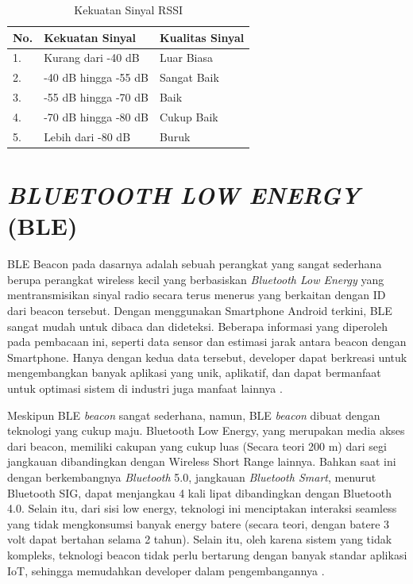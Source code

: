 \begin{table}[H]
	\centering
	\caption{Kekuatan Sinyal RSSI \citep{VerisIndustries2013}}
	\label{t_rssi}
	\begin{tabular}{|l|l|l|}
		\hline
		\textbf{No.} & \textbf{Kekuatan Sinyal} & \textbf{Kualitas Sinyal} \\
		\hline
		1.           & Kurang dari -40 dB       & Luar Biasa               \\
		\hline
		2.           & -40 dB hingga -55 dB     & Sangat Baik              \\
		\hline
		3.           & -55 dB hingga -70 dB     & Baik                     \\
		\hline
		4.           & -70 dB hingga -80 dB     & Cukup Baik               \\
		\hline
		5.           & Lebih dari -80 dB        & Buruk                    \\
		\hline
	\end{tabular}
\end{table}

\section{\uppercase{\textit{BLUETOOTH LOW ENERGY} (BLE)}}
\par BLE Beacon pada dasarnya adalah sebuah perangkat yang sangat sederhana berupa perangkat wireless kecil yang berbasiskan \textit{Bluetooth Low Energy} yang mentransmisikan sinyal radio secara terus menerus yang berkaitan dengan ID dari beacon tersebut. Dengan menggunakan Smartphone Android terkini, BLE sangat mudah untuk dibaca dan dideteksi. Beberapa informasi yang diperoleh pada pembacaan ini, seperti data sensor dan estimasi jarak antara beacon dengan Smartphone. Hanya dengan kedua data tersebut, developer dapat berkreasi untuk mengembangkan banyak aplikasi yang unik, aplikatif, dan dapat bermanfaat untuk optimasi sistem di industri juga manfaat lainnya \citep{Gupta2016}.

\par Meskipun BLE \textit{beacon} sangat sederhana, namun, BLE \textit{beacon} dibuat dengan teknologi yang cukup maju. Bluetooth Low Energy, yang merupakan media akses dari beacon, memiliki cakupan yang cukup luas (Secara teori 200 m) dari segi jangkauan dibandingkan dengan Wireless Short Range lainnya. Bahkan saat ini dengan berkembangnya \textit{Bluetooth} 5.0, jangkauan \textit{Bluetooth Smart}, menurut Bluetooth SIG, dapat menjangkau 4 kali lipat dibandingkan dengan Bluetooth 4.0. Selain itu, dari sisi low energy, teknologi ini menciptakan interaksi seamless yang tidak mengkonsumsi banyak energy batere (secara teori, dengan batere 3 volt dapat bertahan selama 2 tahun). Selain itu, oleh karena sistem yang tidak kompleks, teknologi beacon tidak perlu bertarung dengan banyak standar aplikasi IoT, sehingga memudahkan developer dalam pengembangannya \citep{Gupta2013}.

